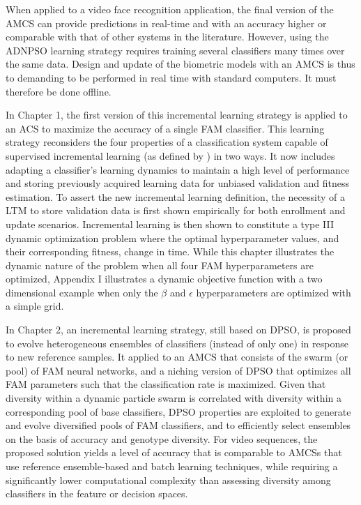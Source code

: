 When applied to a video face recognition application, the final version of the AMCS can provide predictions in real-time and with an accuracy higher or comparable with that of other systems in the literature.
However, using the ADNPSO learning strategy requires training several classifiers many times over the same data.
Design and update of the biometric models with an AMCS is thus to demanding to be performed in real time with standard computers.
It must therefore be done offline.

In Chapter 1, the first version of this incremental learning strategy is applied to an ACS to maximize the accuracy of a single FAM classifier.
This learning strategy reconsiders the four properties of a classification system capable of supervised incremental learning (as defined by \cite{polikar01}) in two ways.
It now includes adapting a classifier's learning dynamics to maintain a high level of performance and storing previously acquired learning data for unbiased validation and fitness estimation.
To assert the new incremental learning definition, the necessity of a LTM to store validation data is first shown empirically for both enrollment and update scenarios.
Incremental learning is then shown to constitute a type III dynamic optimization problem where the optimal hyperparameter values, and their corresponding fitness, change in time.
While this chapter illustrates the dynamic nature of the problem when all four FAM hyperparameters are optimized, Appendix I illustrates a dynamic objective function with a two dimensional example when only the $\beta$ and $\epsilon$ hyperparameters are optimized with a simple grid.

In Chapter 2, an incremental learning strategy, still based on DPSO, is proposed to evolve heterogeneous ensembles of classifiers (instead of only one) in response to new reference samples.
It applied to an AMCS that consists of the swarm (or pool) of FAM neural networks, and a niching version of DPSO that optimizes all FAM parameters such that the classification rate is maximized.
Given that diversity within a dynamic particle swarm is correlated with diversity within a corresponding pool of base classifiers, DPSO properties are exploited to generate and evolve diversified pools of FAM classifiers, and to efficiently select ensembles on the basis of accuracy and genotype diversity.
For video sequences, the proposed solution yields a level of accuracy that is comparable to AMCSs that use reference ensemble-based and batch learning techniques, while requiring a significantly lower computational complexity than assessing diversity among classifiers in the feature or decision spaces.

